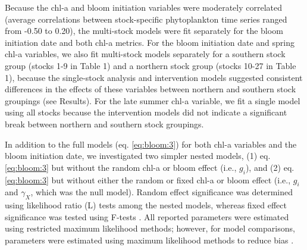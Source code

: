 Because the chl-a and bloom initiation variables were moderately correlated
(average correlations between stock-specific phytoplankton time series ranged
from -0.50 to 0.20), the multi-stock models were fit separately for the bloom
initiation date and both chl-a metrics. For the bloom initiation date and spring
chl-a variables, we also fit multi-stock models separately for a southern stock
group (stocks 1-9 in Table 1) and a northern stock group (stocks 10-27 in Table
1), because the single-stock analysis and intervention models suggested
consistent differences in the effects of these variables between northern and
southern stock groupings (see Results). For the late summer chl-a variable, we
fit a single model using all stocks because the intervention models did not
indicate a significant break between northern and southern stock groupings.

In addition to the full models (eq. \ref{eq:bloom:3}) for both chl-a variables and the bloom
initiation date, we investigated two simpler nested models, (1) eq. \ref{eq:bloom:3} but
without the random chl-a or bloom effect (i.e., \(g_{i}\)), and (2) eq. \ref{eq:bloom:3} but
without either the random or fixed chl-a or bloom effect (i.e., \(g_{i}\) and
\(\gamma_{X}\), which was the null model).  Random effect significance was
determined using likelihood ratio (L) tests among the nested models, whereas
fixed effect significance was tested using F-tests \citep{Pinheiro2000a}. All
reported parameters were estimated using restricted maximum likelihood methods;
however, for model comparisons, parameters were estimated using maximum
likelihood methods to reduce bias \citep{Pinheiro2000a}.


